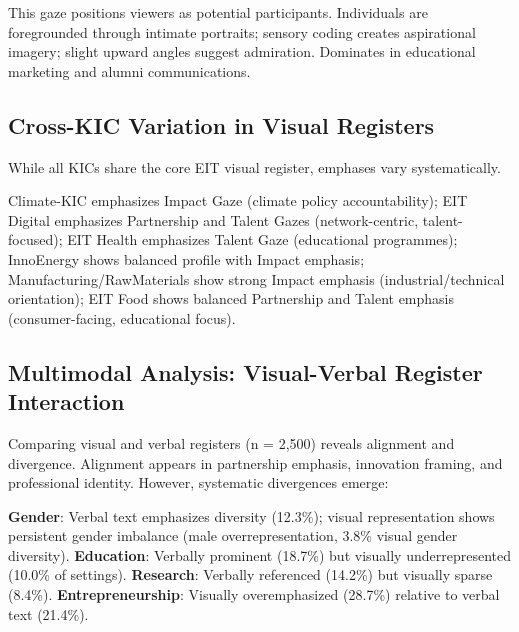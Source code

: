 \documentclass[../main.tex]{subfiles}
\begin{document}
This gaze positions viewers as potential participants. Individuals are foregrounded through intimate portraits; sensory coding creates aspirational imagery; slight upward angles suggest admiration. Dominates in educational marketing and alumni communications.

\subsection{Cross-KIC Variation in Visual Registers}

While all KICs share the core EIT visual register, emphases vary systematically.


Climate-KIC emphasizes Impact Gaze (climate policy accountability); EIT Digital emphasizes Partnership and Talent Gazes (network-centric, talent-focused); EIT Health emphasizes Talent Gaze (educational programmes); InnoEnergy shows balanced profile with Impact emphasis; Manufacturing/RawMaterials show strong Impact emphasis (industrial/technical orientation); EIT Food shows balanced Partnership and Talent emphasis (consumer-facing, educational focus).

\subsection{Multimodal Analysis: Visual-Verbal Register Interaction}

Comparing visual and verbal registers (n = 2,500) reveals alignment and divergence. Alignment appears in partnership emphasis, innovation framing, and professional identity. However, systematic divergences emerge:


\textbf{Gender}: Verbal text emphasizes diversity (12.3\%); visual representation shows persistent gender imbalance (male overrepresentation, 3.8\% visual gender diversity). \textbf{Education}: Verbally prominent (18.7\%) but visually underrepresented (10.0\% of settings). \textbf{Research}: Verbally referenced (14.2\%) but visually sparse (8.4\%). \textbf{Entrepreneurship}: Visually overemphasized (28.7\%) relative to verbal text (21.4\%).
\end{document}

